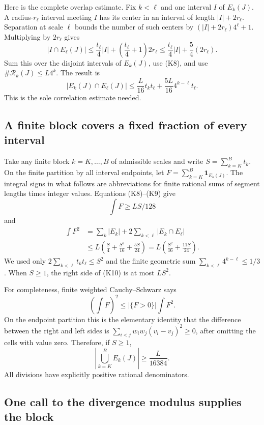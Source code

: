 Here is the complete overlap estimate.  Fix $k<\ell$ and one interval
$I$ of $E_k(J)$.  A radius-$r_\ell$ interval meeting $I$ has its center
in an interval of length $|I|+2r_\ell$.  Separation at scale $\ell$
bounds the number of such centers by
$(|I|+2r_\ell)4^\ell+1$.  Multiplying by $2r_\ell$ gives
\[
 |I\cap E_\ell(J)|
 \leq\frac{t_\ell}{4}|I|
       +\left(\frac{t_\ell}{4}+1\right)2r_\ell
 \leq\frac{t_\ell}{4}|I|+\frac54(2r_\ell).
\]
Sum this over the disjoint intervals of $E_k(J)$, use (K8), and use
$\#\mathcal R_k(J)\leq L4^k$.  The result is
\[
 |E_k(J)\cap E_\ell(J)|
 \leq\frac L{16}t_kt_\ell
       +\frac{5L}{16}4^{k-\ell}t_\ell.
 \tag{K9}
\]
This is the sole correlation estimate needed.

\subsection{A finite block covers a fixed fraction of every interval}

Take any finite block $k=K,\ldots,B$ of admissible scales and write
$S=\sum_{k=K}^B t_k$.  On the finite partition by all interval endpoints,
let $F=\sum_{k=K}^B\mathbf1_{E_k(J)}$.  The integral signs in what follows
are abbreviations for finite rational sums of segment lengths times
integer values.  Equations (K8)--(K9) give
\[
 \int F\geq LS/128
\]
and
\begin{align*}
 \int F^2
 &=\sum_k|E_k|+2\sum_{k<\ell}|E_k\cap E_\ell|\\
 &\leq L\left(\frac S4+\frac{S^2}{16}+\frac{5S}{24}\right)
  =L\left(\frac{S^2}{16}+\frac{11S}{24}\right).
 \tag{K10}
\end{align*}
We used only $2\sum_{k<\ell}t_kt_\ell\leq S^2$ and the finite geometric
sum $\sum_{k<\ell}4^{k-\ell}\leq1/3$.  When $S\geq1$, the right side
of (K10) is at most $LS^2$.

For completeness, finite weighted Cauchy--Schwarz says
\[
 (\int F)^2\leq |\{F>0\}|\int F^2.
\]
On the endpoint partition this is the elementary identity that the
difference between the right and left sides is
$\sum_{i<j}w_iw_j(v_i-v_j)^2\geq0$, after omitting the cells with value
zero.  Therefore, if $S\geq1$,
\[
 \left|\bigcup_{k=K}^B E_k(J)\right|\geq\frac{L}{16384}.
 \tag{K11}
\]
All divisions have explicitly positive rational denominators.

\subsection{One call to the divergence modulus supplies the block}

